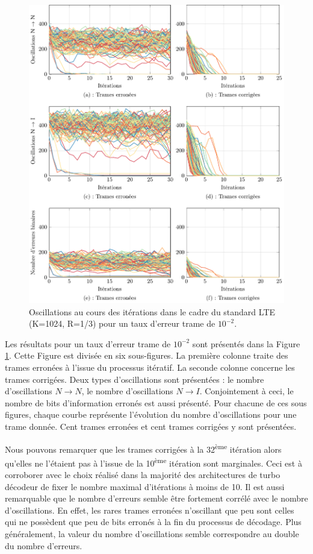 \begin{figure}[!ht]
	\hspace*{-.7cm}
	\begin{center}
	\includegraphics[width=.9\textwidth]{main/ch2_fig/tikz/it_lte10-2.pdf}
	\caption{Oscillations au cours des itérations dans le cadre du standard LTE (K=1024, R=1/3) pour un taux d'erreur 
	trame de $10^{-2}$. \label{ch2:fig:it_lte_1}}
	\end{center}
\end{figure}

Les résultats pour un taux d'erreur trame de $10^{-2}$ sont présentés dans la  Figure \ref{ch2:fig:it_lte_1}. Cette 
Figure est divisée en six sous-figures. La première colonne traite des trames erronées à l'issue du processus 
itératif. La seconde colonne concerne les trames corrigées. Deux types d'oscillations sont présentées : le nombre d'oscillations 
$N\rightarrow N$, le nombre d'oscillations $N\rightarrow I$. Conjointement à ceci, le nombre de bits d'information erronés est aussi 
présenté. Pour chacune de ces sous figures, chaque courbe représente l'évolution du nombre d'oscillations
pour une trame donnée. Cent trames erronées et cent trames corrigées y sont présentées.

Nous pouvons remarquer que les trames corrigées à la 32\textsuperscript{ème} itération alors qu'elles ne l'étaient pas à 
l'issue de la 10\textsuperscript{ème} itération sont marginales. Ceci est à corroborer avec le choix réalisé dans la majorité des 
architectures de turbo décodeur de fixer le nombre maximal d'itérations à moins de 10.
Il est aussi remarquable que le nombre d'erreurs semble être fortement corrélé avec le nombre d'oscillations. En effet, 
les rares trames erronées n'oscillant que peu sont celles qui ne possèdent que peu de bits erronés à la fin du processus
de décodage. Plus généralement,
la valeur du nombre d'oscillations semble correspondre au double du nombre d'erreurs.

